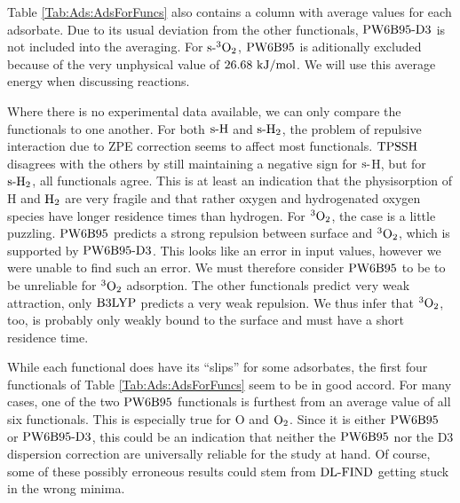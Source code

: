 \documentclass[8.5pt,twoside,twocolumn]{article}
\newcommand\sur{\enmat{\te{s-}}}
\newcommand\dlfind{\enmat{\te{DL-FIND}}}
\newcommand\tripot{\enmat{{^3\ot}}}
\newcommand\kmo{\enmat{\te {kJ/mol}}}
\theoremstyle{standard}
\begin{document}
Table \ref{Tab:Ads:AdsForFuncs} also contains a column with average values
for each adsorbate. Due to its usual deviation from the other functionals,
$\text{PW6B95}\text{-D3}$ is not included into the averaging. For $\sur\tripot$, 
$\text{PW6B95}$ is aditionally excluded because of the very unphysical value of
$26.68~\kmo$. We will use this average energy when discussing reactions.

Where there is no experimental data available, we can only compare the
functionals to one another. For both $\sur\te H$ and $\sur\htw$, the
problem of repulsive interaction due to ZPE correction seems to affect
most functionals. $\text{TPSSH}$ disagrees with the others by still maintaining
a negative sign for $\sur$H, but for $\sur\htw$, all functionals agree.
This is at least an indication that the physisorption of H and $\text H_2$ are
very fragile and that rather oxygen and hydrogenated oxygen species
have longer residence times than hydrogen.
For $\tripot$, the case is a little puzzling. $\text{PW6B95}$ predicts a strong
repulsion between surface and $\tripot$, which is supported by
$\text{PW6B95}\text{-D3}$. This looks like an error in input values, however we were
unable to find such an error. We must therefore consider $\text{PW6B95}$
to be to be unreliable for $\tripot$ adsorption. The other
functionals predict very weak attraction, only $\text{B3LYP}$ predicts
a very weak repulsion. We thus infer that $\tripot$, too, is
probably only weakly bound to the surface and must have a short
residence time.

While each functional does have its ``slips'' for some adsorbates, the first four functionals of
Table \ref{Tab:Ads:AdsForFuncs} seem to be in good accord. 
For many cases, one of the two $\text{PW6B95}$ functionals is furthest from an average
value of all six functionals. This is especially true for O and $\text O_2$.
Since it is either $\text{PW6B95}$ or $\text{PW6B95}\text{-D3}$, this could be an indication
that neither the $\text{PW6B95}$ nor the D3 dispersion correction are universally
reliable for the study at hand. Of course, some of these possibly erroneous
results could stem from $\dlfind$ getting stuck in the wrong minima. 
\end{document}
